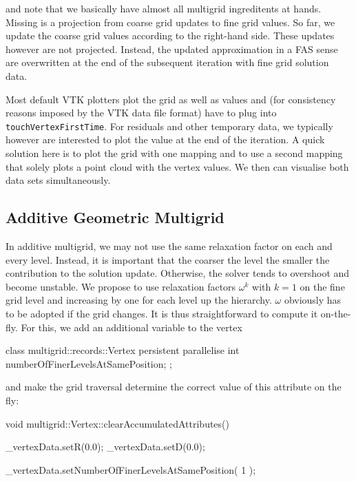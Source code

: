 \noindent
and note that we basically have almost all multigrid ingreditents at hands.
Missing is a projection from coarse grid updates to fine grid values.
So far, we update the coarse grid values according to the right-hand side.
These updates however are not projected.
Instead, the updated approximation in a FAS sense are overwritten at the end of
the subsequent iteration with fine grid solution data. 


\begin{remark}
  Most default VTK plotters plot the grid as well as values and (for
  consistency reasons imposed by the VTK data file format) have to plug into
  \texttt{touchVertexFirstTime}. For residuals and other temporary data, we
  typically however are interested to plot the value at the end of the
  iteration. A quick solution here is to plot the grid with one mapping and to
  use a second mapping that solely plots a point cloud with the vertex values.
  We then can visualise both data sets simultaneously.
\end{remark}





\subsection{Additive Geometric Multigrid}

In additive multigrid, we may not use the same relaxation factor on each and
every level. 
Instead, it is important that the coarser the level the smaller the contribution
to the solution update.
Otherwise, the solver tends to overshoot and become unstable. 
We propose to use relaxation factors $\omega ^k$ with $k=1$ on the fine grid
level and increasing by one for each level up the hierarchy.
$\omega $ obviously has to be adopted if the grid changes.
It is thus straightforward to compute it on-the-fly. 
For this, we add an additional variable to the vertex

\begin{code}
class multigrid::records::Vertex {  
  persistent parallelise int  numberOfFinerLevelsAtSamePosition;
};
\end{code}

\noindent
and make the grid traversal determine the correct value of this attribute
on the fly:



void multigrid::Vertex::clearAccumulatedAttributes() {
  _vertexData.setR(0.0);
  _vertexData.setD(0.0);
  
  _vertexData.setNumberOfFinerLevelsAtSamePosition( 1 );
}


